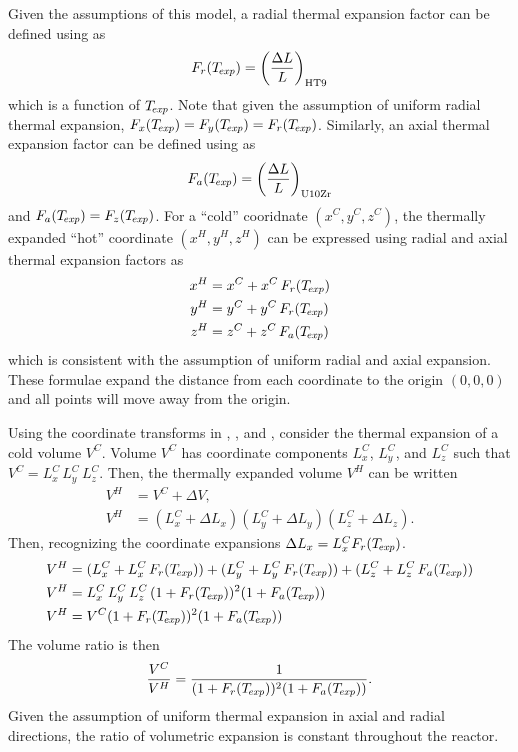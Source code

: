     Given the assumptions of this model, a radial thermal expansion factor can 
    be defined using  as
    \begin{equation}
      \label{eq:lef_r}
      F_r(T_{\!\mbox{\scriptsize \em exp}}) = \left(\frac{\Delta L}{L}\right)_{\text{HT9}}
    \end{equation}
    which is a function of $T_{\!\mbox{\scriptsize \em exp}}$. Note that given the assumption of uniform
    radial thermal expansion, ${F_x(T_{\!\mbox{\scriptsize \em exp}}) = F_y(T_{\!\mbox{\scriptsize \em exp}}) = F_r(T_{\!\mbox{\scriptsize \em exp}})}$.
    Similarly, an axial thermal expansion factor can be defined using
     as 
    \begin{equation}
      \label{eq:lef_a}
      F_a(T_{\!\mbox{\scriptsize \em exp}}) = \left(\frac{\Delta L}{L}\right)_{\text{U10Zr}}
    \end{equation}
    and $F_a(T_{\!\mbox{\scriptsize \em exp}}) = F_z(T_{\!\mbox{\scriptsize \em exp}})$. For a ``cold'' cooridnate 
    $(x^C,y^C,z^C)$, the thermally expanded ``hot'' coordinate $(x^H,y^H,z^H)$ 
    can be expressed using radial and axial thermal expansion factors as
    \begin{align}
      \label{eq:expand_x}
      x^H &= x^C + x^C \, F_r(T_{\!\mbox{\scriptsize \em exp}}) \\
      \label{eq:expand_y}
      y^H &= y^C + y^C \, F_r(T_{\!\mbox{\scriptsize \em exp}}) \\
      \label{eq:expand_z}
      z^H &= z^C + z^C \, F_a(T_{\!\mbox{\scriptsize \em exp}})
    \end{align}
    which is consistent with the assumption of uniform radial and axial 
    expansion. These formulae expand the distance from each coordinate to the
    origin $(0,0,0)$ and all points will move away from the origin.

    Using the coordinate transforms in , , 
    and , consider the thermal expansion of a cold volume 
    $V^C$.  Volume $V^C$ has coordinate components $L_x^C$, $L_y^C$, and $L_z^C$
    such that ${V^C = L_x^C \, L_y^C \, L_z^C}$. Then, the thermally expanded 
    volume $V^H$ can be written
    \begin{align}
      V^H &= V^C + \Delta V, \\
      V^H &= (L_x^C + \Delta L_x) (L_y^C + \Delta L_y) (L_z^C + \Delta L_z). 
    \end{align}
    Then, recognizing the coordinate expansions 
    ${\Delta L_x = L_x^C F_r(T_{\!\mbox{\scriptsize \em exp}})}$.
    \begin{align}
      V^H &= (L_x^C + L_x^C \, F_r(T_{\!\mbox{\scriptsize \em exp}})) + (L_y^C + L_y^C \, F_r(T_{\!\mbox{\scriptsize \em exp}})) + 
        (L_z^C + L_z^C \, F_a(T_{\!\mbox{\scriptsize \em exp}})) \\
      V^H &= L_x^C \, L_y^C \, L_z^C \, (1 + F_r(T_{\!\mbox{\scriptsize \em exp}}))^2 (1+F_a(T_{\!\mbox{\scriptsize \em exp}})) \\
      V^H &= V^C (1 + F_r(T_{\!\mbox{\scriptsize \em exp}}))^2 (1+F_a(T_{\!\mbox{\scriptsize \em exp}}))
    \end{align}
    The volume ratio is then
    \begin{equation}
      \label{eq:volume_ratio}
      \frac{V^C}{V^H} = \frac{1}{(1+F_r(T_{\!\mbox{\scriptsize \em exp}}))^2 (1+F_a(T_{\!\mbox{\scriptsize \em exp}}))}.
    \end{equation}
    Given the assumption of uniform thermal expansion in axial and radial
    directions, the ratio of volumetric expansion is constant throughout the
    reactor.

